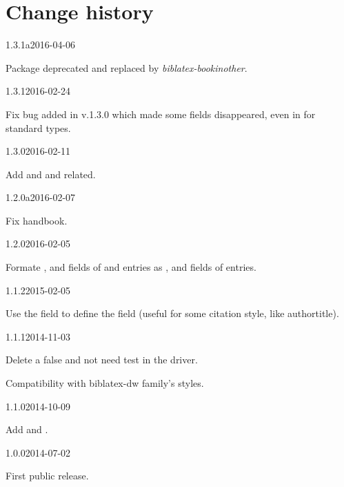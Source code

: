 \documentclass{ltxdockit}[2011/03/25]
\begin{document}
\section{Change history}


\begin{changelog}


\begin{release}{1.3.1a}{2016-04-06}
\item Package deprecated and replaced by \emph{biblatex-bookinother}.
\end{release}

\begin{release}{1.3.1}{2016-02-24}
\item Fix bug added in v.1.3.0 which made some fields disappeared, even in for standard types.
\end{release}

\begin{release}{1.3.0}{2016-02-11}
\item Add  and  and related.
\end{release}

\begin{release}{1.2.0a}{2016-02-07}
\item Fix handbook.
\end{release}

\begin{release}{1.2.0}{2016-02-05}
\item Formate   ,  and  fields of   and  entries as ,  and  fields of  entries.
\end{release}

\begin{release}{1.1.2}{2015-02-05}
\item Use the  field to define the  field (useful for some citation style, like authortitle).
\end{release}

\begin{release}{1.1.1}{2014-11-03}
\item Delete a false and not need test in the driver.
\item Compatibility with biblatex-dw family's styles.
\end{release}
\begin{release}{1.1.0}{2014-10-09}
\item Add  and .
\end{release}

\begin{release}{1.0.0}{2014-07-02}
\item First public release.
\end{release}
\end{changelog}
\end{document}
